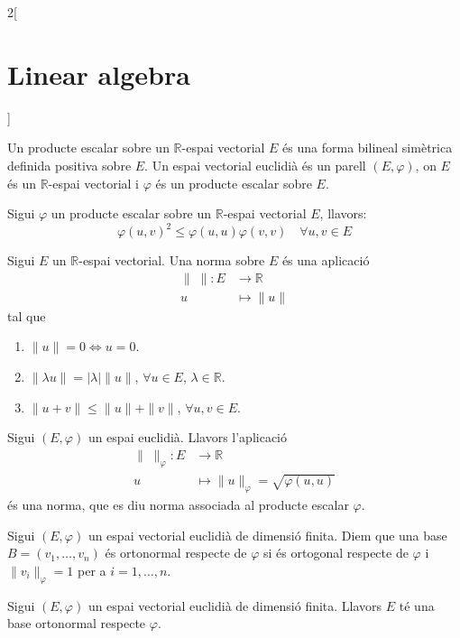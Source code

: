 \documentclass[class=article,10pt,crop=false]{standalone}
\begin{document}
\begin{multicols}{2}[\section{Linear algebra}]
\begin{definition}
Un producte escalar sobre un $\mathbb{R}$-espai vectorial $E$ és una forma bilineal simètrica definida positiva sobre $E$. Un espai vectorial euclidià és un parell $(E,\varphi)$, on $E$ és un $\mathbb{R}$-espai vectorial i $\varphi$ és un producte escalar sobre $E$.\label{espai_euclidia}
\end{definition}
\begin{theorem}
Sigui $\varphi$ un producte escalar sobre un $\mathbb{R}$-espai vectorial $E$, llavors: $$\varphi(u,v)^2\leq \varphi(u,u)\varphi(v,v)\quad\forall u,v\in E$$
\end{theorem}
\begin{definition}
Sigui $E$ un $\mathbb{R}$-espai vectorial. Una norma sobre $E$ és una aplicació \begin{align*}
    \|\;\|:E&\rightarrow\mathbb{R}\\
    u&\mapsto\|u\|
\end{align*}
tal que \begin{enumerate}
    \item $\|u\|=0\iff u=0$.
    \item $\|\lambda u\|=|\lambda|\|u\|$, $\forall u\in E$, $\lambda\in\mathbb{R}$.
    \item $\|u+v\|\leq\|u\|+\|v\|$, $\forall u,v\in E$.
\end{enumerate}
\end{definition}
\begin{prop}
Sigui $(E,\varphi)$ un espai euclidià. Llavors l'aplicació
\begin{align*}
    \|\;\|_\varphi:E&\rightarrow\mathbb{R}\\
    u&\mapsto\|u\|_\varphi=\sqrt{\varphi(u,u)}
\end{align*}
és una norma, que es diu norma associada al producte escalar $\varphi$.
\end{prop}
\begin{definition}
Sigui $(E,\varphi)$ un espai vectorial euclidià de dimensió finita. Diem que una base $B=(v_1,\ldots,v_n)$ és ortonormal respecte de $\varphi$ si és ortogonal respecte de $\varphi$ i $\|v_i\|_\varphi=1$ per a $i=1,\ldots,n$.
\end{definition}
\begin{corollary}
Sigui $(E,\varphi)$ un espai vectorial euclidià de dimensió finita. Llavors $E$ té una base ortonormal respecte $\varphi$.
\end{corollary}
\begin{definition}

\end{definition}
\end{multicols}
\end{document}
